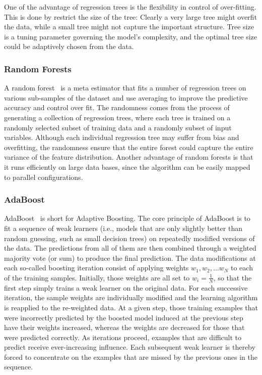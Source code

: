 One of the advantage of regression trees is the flexibility in control of
over-fitting. This is done by restrict the size of the tree: Clearly a very
large tree might overfit the data, while a small tree might not capture the
important structure. Tree size is a tuning parameter governing the model's
complexity, and the optimal tree size could be adaptively chosen from the
data.

\subsubsection{Random Forests}
\label{ssub:random_forests}
A random forest~\cite{breiman2001random} is a meta estimator that fits a number
of regression trees on various sub-samples of the dataset and use averaging to
improve the predictive accuracy and control over fit. The randomness comes from
the process of generating a collection of regression trees, where each tree is
trained on a randomly selected subset of training data and a randomly subset of
input variables. Although each individual regression tree may suffer from bias
and overfitting, the randomness ensure that the entire forest could capture the
entire variance of the feature distribution. Another advantage of random
forests is that it runs efficiently on large data bases, since the algorithm
can be easily mapped to parallel configurations.

\subsubsection{AdaBoost}
\label{ssub:adaboost}
AdaBoost~\cite{collins2002} is short for Adaptive Boosting. The core principle
of AdaBoost is to fit a sequence of weak learners (i.e., models that are only
slightly better than random guessing, such as small decision trees) on
repeatedly modified versions of the data.  The predictions from all of them are
then combined through a weighted majority vote (or sum) to produce the final
prediction. The data modifications at each so-called boosting iteration consist
of applying weights $w_1, w_2, \ldots w_N$ to each of the training samples.
Initially, those weights are all set to $w_i = \frac{1}{N}$, so that the first
step simply trains a weak learner on the original data. For each successive
iteration, the sample weights are individually modified and the learning
algorithm is reapplied to the re-weighted data. At a given step, those training
examples that were incorrectly predicted by the boosted model induced at the
previous step have their weights increased, whereas the weights are decreased
for those that were predicted correctly. As iterations proceed, examples that
are difficult to predict receive ever-increasing influence. Each subsequent
weak learner is thereby forced to concentrate on the examples that are missed
by the previous ones in the sequence.

